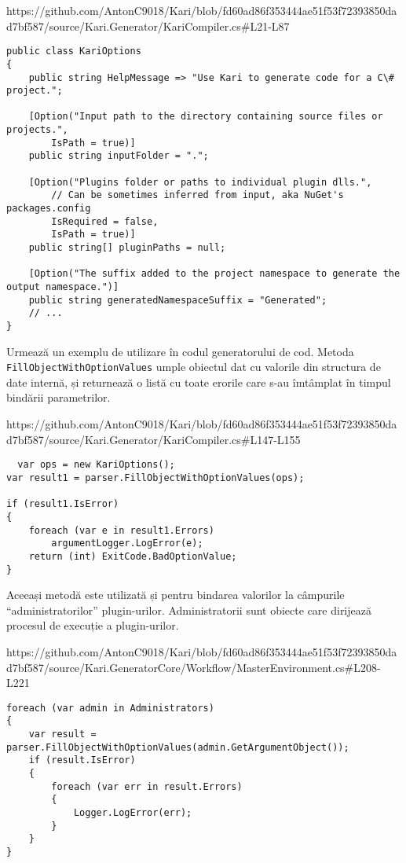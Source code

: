 \documentclass{report}
\begin{document}
https://github.com/AntonC9018/Kari/blob/fd60ad86f353444ae51f53f72393850dad7bf587/source/Kari.Generator/KariCompiler.cs#L21-L87

\begin{lstlisting}
public class KariOptions
{
    public string HelpMessage => "Use Kari to generate code for a C\# project.";

    [Option("Input path to the directory containing source files or projects.", 
        IsPath = true)] 
    public string inputFolder = ".";

    [Option("Plugins folder or paths to individual plugin dlls.",
        // Can be sometimes inferred from input, aka NuGet's packages.config
        IsRequired = false,
        IsPath = true)]
    public string[] pluginPaths = null;

    [Option("The suffix added to the project namespace to generate the output namespace.")]
    public string generatedNamespaceSuffix = "Generated";
    // ...
}
\end{lstlisting}

Urmează un exemplu de utilizare în codul generatorului de cod.
Metoda \texttt{FillObjectWithOptionValues} umple obiectul dat cu valorile din structura de date internă, și returnează o listă cu toate erorile care s-au îmtâmplat în timpul bindării parametrilor. 

https://github.com/AntonC9018/Kari/blob/fd60ad86f353444ae51f53f72393850dad7bf587/source/Kari.Generator/KariCompiler.cs#L147-L155

\begin{lstlisting}
  var ops = new KariOptions();
var result1 = parser.FillObjectWithOptionValues(ops);

if (result1.IsError)
{
    foreach (var e in result1.Errors)
        argumentLogger.LogError(e);
    return (int) ExitCode.BadOptionValue;
}
\end{lstlisting}

Aceeași metodă este utilizată și pentru bindarea valorilor la câmpurile ``administratorilor'' plugin-urilor.
Administratorii sunt obiecte care dirijează procesul de execuție a plugin-urilor.


https://github.com/AntonC9018/Kari/blob/fd60ad86f353444ae51f53f72393850dad7bf587/source/Kari.GeneratorCore/Workflow/MasterEnvironment.cs#L208-L221

\begin{lstlisting}
foreach (var admin in Administrators)
{
    var result = parser.FillObjectWithOptionValues(admin.GetArgumentObject());
    if (result.IsError)
    {
        foreach (var err in result.Errors)
        {
            Logger.LogError(err);
        }
    }
}
\end{lstlisting}
\end{document}
